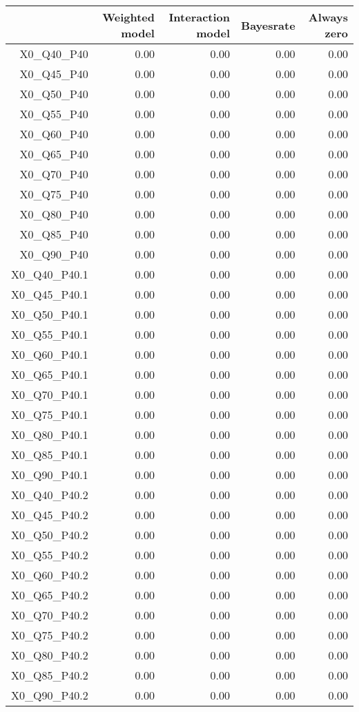 \begin{table}[ht]
\centering
\begin{tabular}{rrrrr}
  \hline
 & Weighted model & Interaction model & Bayesrate & Always zero \\ 
  \hline
X0\_Q40\_P40 & 0.00 & 0.00 & 0.00 & 0.00 \\ 
  X0\_Q45\_P40 & 0.00 & 0.00 & 0.00 & 0.00 \\ 
  X0\_Q50\_P40 & 0.00 & 0.00 & 0.00 & 0.00 \\ 
  X0\_Q55\_P40 & 0.00 & 0.00 & 0.00 & 0.00 \\ 
  X0\_Q60\_P40 & 0.00 & 0.00 & 0.00 & 0.00 \\ 
  X0\_Q65\_P40 & 0.00 & 0.00 & 0.00 & 0.00 \\ 
  X0\_Q70\_P40 & 0.00 & 0.00 & 0.00 & 0.00 \\ 
  X0\_Q75\_P40 & 0.00 & 0.00 & 0.00 & 0.00 \\ 
  X0\_Q80\_P40 & 0.00 & 0.00 & 0.00 & 0.00 \\ 
  X0\_Q85\_P40 & 0.00 & 0.00 & 0.00 & 0.00 \\ 
  X0\_Q90\_P40 & 0.00 & 0.00 & 0.00 & 0.00 \\ 
  X0\_Q40\_P40.1 & 0.00 & 0.00 & 0.00 & 0.00 \\ 
  X0\_Q45\_P40.1 & 0.00 & 0.00 & 0.00 & 0.00 \\ 
  X0\_Q50\_P40.1 & 0.00 & 0.00 & 0.00 & 0.00 \\ 
  X0\_Q55\_P40.1 & 0.00 & 0.00 & 0.00 & 0.00 \\ 
  X0\_Q60\_P40.1 & 0.00 & 0.00 & 0.00 & 0.00 \\ 
  X0\_Q65\_P40.1 & 0.00 & 0.00 & 0.00 & 0.00 \\ 
  X0\_Q70\_P40.1 & 0.00 & 0.00 & 0.00 & 0.00 \\ 
  X0\_Q75\_P40.1 & 0.00 & 0.00 & 0.00 & 0.00 \\ 
  X0\_Q80\_P40.1 & 0.00 & 0.00 & 0.00 & 0.00 \\ 
  X0\_Q85\_P40.1 & 0.00 & 0.00 & 0.00 & 0.00 \\ 
  X0\_Q90\_P40.1 & 0.00 & 0.00 & 0.00 & 0.00 \\ 
  X0\_Q40\_P40.2 & 0.00 & 0.00 & 0.00 & 0.00 \\ 
  X0\_Q45\_P40.2 & 0.00 & 0.00 & 0.00 & 0.00 \\ 
  X0\_Q50\_P40.2 & 0.00 & 0.00 & 0.00 & 0.00 \\ 
  X0\_Q55\_P40.2 & 0.00 & 0.00 & 0.00 & 0.00 \\ 
  X0\_Q60\_P40.2 & 0.00 & 0.00 & 0.00 & 0.00 \\ 
  X0\_Q65\_P40.2 & 0.00 & 0.00 & 0.00 & 0.00 \\ 
  X0\_Q70\_P40.2 & 0.00 & 0.00 & 0.00 & 0.00 \\ 
  X0\_Q75\_P40.2 & 0.00 & 0.00 & 0.00 & 0.00 \\ 
  X0\_Q80\_P40.2 & 0.00 & 0.00 & 0.00 & 0.00 \\ 
  X0\_Q85\_P40.2 & 0.00 & 0.00 & 0.00 & 0.00 \\ 
  X0\_Q90\_P40.2 & 0.00 & 0.00 & 0.00 & 0.00 \\ 
   \hline
\end{tabular}
\end{table}
